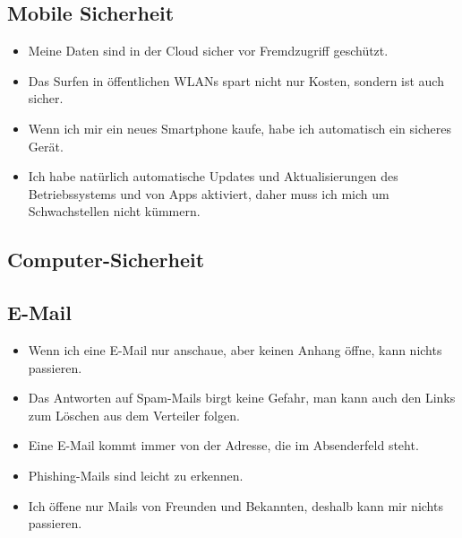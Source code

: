 \subsection{Mobile Sicherheit}

\begin{frame}
\begin{itemize}
	\item Meine Daten sind in der Cloud sicher vor Fremdzugriff geschützt.
	\item Das Surfen in öffentlichen WLANs spart nicht nur Kosten, sondern ist auch sicher.
	\item Wenn ich mir ein neues Smartphone kaufe, habe ich automatisch ein sicheres Gerät.
	\item Ich habe natürlich automatische Updates und Aktualisierungen des Betriebssystems und von Apps aktiviert, daher muss ich mich um Schwachstellen nicht kümmern.
\end{itemize}
\end{frame}

\subsection{Computer-Sicherheit}


\subsection{E-Mail}

\begin{frame}
\begin{itemize}
	\item Wenn ich eine E-Mail nur anschaue, aber keinen Anhang öffne, kann nichts passieren.
	\item Das Antworten auf Spam-Mails birgt keine Gefahr, man kann auch den Links zum Löschen aus dem Verteiler folgen.
	\item Eine E-Mail kommt immer von der Adresse, die im Absenderfeld steht.
	\item Phishing-Mails sind leicht zu erkennen.
	\item Ich öffene nur Mails von Freunden und Bekannten, deshalb kann mir nichts passieren.
\end{itemize}
\end{frame}

